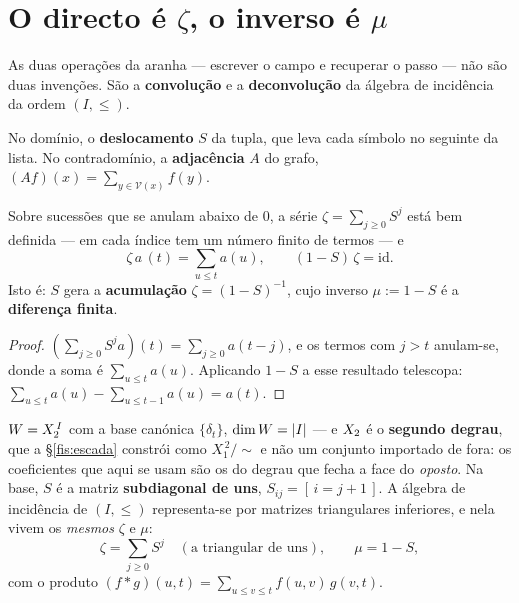 \documentclass[livro.tex]{subfiles}
\begin{document}

\section{O directo é $\zeta$, o inverso é $\mu$}\label{fis:zetamu}

\noindent As duas operações da aranha --- escrever o campo e recuperar o passo
--- não são duas invenções. São a \textbf{convolução} e a \textbf{deconvolução}
da álgebra de incidência da ordem $(I,\le)$.

\begin{definicao}\label{fis:def:ops}
No domínio, o \textbf{deslocamento} $S$ da tupla, que leva cada símbolo no
seguinte da lista. No contradomínio, a \textbf{adjacência} $A$ do grafo,
$(Af)(x)=\sum_{y\in\mathcal{V}(x)}f(y)$.
\end{definicao}

\begin{teorema}\label{fis:thm:shift}
Sobre sucessões que se anulam abaixo de $0$, a série $\zeta=\sum_{j\ge0}S^{j}$
está bem definida --- em cada índice tem um número finito de termos --- e
\[
\zeta\,a\,(t)=\sum_{u\le t}a(u),\qquad (1-S)\,\zeta=\mathrm{id}.
\]
Isto é: $S$ gera a \textbf{acumulação} $\zeta=(1-S)^{-1}$, cujo inverso
$\mu:=1-S$ é a \textbf{diferença finita}.
\end{teorema}

\begin{proof}
$(\sum_{j\ge0}S^j a)(t)=\sum_{j\ge0}a(t-j)$, e os termos com $j>t$ anulam-se,
donde a soma é $\sum_{u\le t}a(u)$. Aplicando $1-S$ a esse resultado telescopa:
$\sum_{u\le t}a(u)-\sum_{u\le t-1}a(u)=a(t)$.
\end{proof}

\begin{definicao}\label{fis:def:incid}
$W=X_2^{\,I}$ com a base canónica $\{\delta_t\}$, $\dim W=\lvert I\rvert$ --- e $X_2$ é
o \textbf{segundo degrau}, que a §\ref{fis:escada} constrói como $X_1^{\,2}/{\sim}$
e não um conjunto importado de fora: os coeficientes que aqui se usam são os do
degrau que fecha a face do \emph{oposto}. Na base, $S$ é a matriz
\textbf{subdiagonal de uns}, $S_{ij}=[\,i=j+1\,]$. A álgebra de incidência de
$(I,\le)$ representa-se por matrizes triangulares inferiores, e nela vivem os
\emph{mesmos} $\zeta$ e $\mu$:
\[
\zeta=\sum_{j\ge0}S^{j}\quad(\text{a triangular de uns}),\qquad \mu=1-S ,
\]
com o produto $(f*g)(u,t)=\sum_{u\le v\le t}f(u,v)\,g(v,t)$.
\end{definicao}
\end{document}
